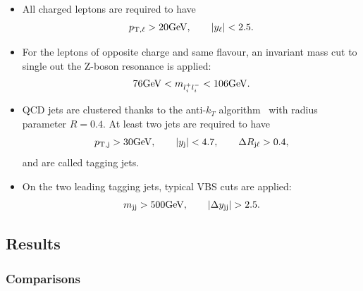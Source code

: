 \documentclass[11pt]{cernrep}
\begin{document}
\begin{itemize}
\item All charged leptons are required to have
    \begin{align}
        \label{cut:1}
         p_{\rm T, \ell} >  20{\rm GeV},\qquad |y_{\ell}| < 2.5.
    \end{align}
\item For the leptons of opposite charge and same flavour, an invariant mass cut to single out the Z-boson resonance is applied:
    \begin{align}
        \label{cut:2}
         76 {\rm GeV} < m_{l_i^+ l_i^-} < 106 {\rm GeV}.
    \end{align}

\item QCD jets are clustered thanks to the anti-$k_T$ algorithm~\cite{Cacciari:2008gp} with radius parameter $R=0.4$.
      At least two jets are required to have
        \begin{align}
        \label{cut:3}
         p_{\rm T, j} >  30{\rm GeV}, \qquad |y_{\rm j}| < 4.7, \qquad \Delta R_{\rm j \ell} > 0.4,
        \end{align}
        and are called tagging jets.
\item On the two leading tagging jets, typical VBS cuts are applied:
        \begin{align}
        \label{cut:4}
         m_{\rm j j} >  500{\rm GeV},\qquad |\Delta y_{\rm j j}| > 2.5.
        \end{align}
\end{itemize}

\subsection{Results \label{vbs_results}}

\subsubsection*{Comparisons}
\end{document}
